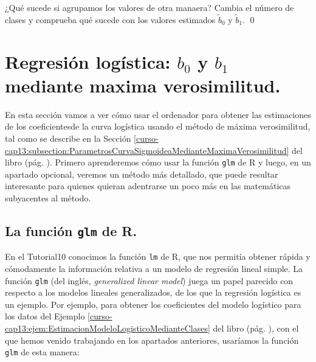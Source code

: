 \documentclass[10pt,a4paper]{article}\usepackage[]{graphicx}\usepackage[]{color}
\begin{document}
\begin{ejercicio}
\label{tut13:ejercicio04}
¿Qué sucede  si agrupamos los valores de otra manaera? Cambia el número de clases y comprueba qué sucede con los valores estimados $\widetilde b_0$ y $\widetilde b_1$.
\qed
\end{ejercicio}


\section{Regresión logística:  $b_0$ y $b_1$  mediante maxima verosimilitud.}
\label{tut13:section:ParametrosCurvaSigmoideaMedianteMaximaVerosimilitud}

En esta sección vamos a ver cómo usar el ordenador para obtener las estimaciones de los coeficientesde la curva logística usando el método de máxima verosimilitud, tal como se describe en la Sección \ref{curso-cap13:subsection:ParametrosCurvaSigmoideaMedianteMaximaVerosimilitud} del libro (pág. \pageref{curso-cap13:subsection:ParametrosCurvaSigmoideaMedianteMaximaVerosimilitud}). Primero aprenderemos cómo usar la función {\tt glm} de R y luego, en un apartado opcional, veremos un método más detallado, que puede resultar interesante para quienes quieran adentrarse un poco más en las matemáticas subyacentes al método.

\subsection{La función {\tt glm} de R.}
\label{tut13:subsec:funcionGlm}

En el Tutorial10 conocimos la función {\tt lm} de R, que nos permitía obtener rápida y cómodamente la información relativa a  un modelo de regresión lineal simple. La función {\tt glm} (del inglés, {\em generalized linear model}) juega un papel parecido con respecto a los modelos lineales generalizados, de los que la regresión logística es un ejemplo. Por ejemplo, para obtener los coeficientes del modelo logístico para los datos del Ejemplo \ref{curso-cap13:ejem:EstimacionModeloLogisticoMedianteClases} del libro (pág. \pageref{curso-cap13:ejem:EstimacionModeloLogisticoMedianteClases}), con el que hemos venido trabajando en los apartados anteriores, usaríamos la función {\tt glm} de esta manera:
\end{document}
